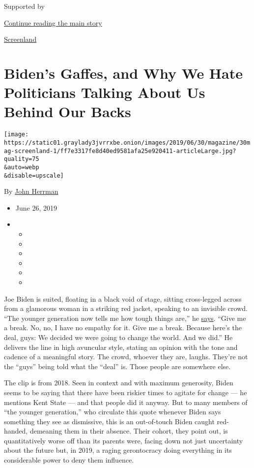 Supported by

\protect\hyperlink{after-sponsor}{Continue reading the main story}

\href{/column/screenland}{Screenland}

\hypertarget{bidens-gaffes-and-why-we-hate-politicians-talking-about-us-behind-our-backs}{%
\section{Biden's Gaffes, and Why We Hate Politicians Talking About Us
Behind Our
Backs}\label{bidens-gaffes-and-why-we-hate-politicians-talking-about-us-behind-our-backs}}

\texttt{[image: https://static01.graylady3jvrrxbe.onion/images/2019/06/30/magazine/30mag-screenland-1/ff7e3317fe8d40ed9581afa25e920411-articleLarge.jpg?quality=75\\\&auto=webp\\\&disable=upscale]}

By \href{https://www.nytimes3xbfgragh.onion/by/john-herrman}{John
Herrman}

\begin{itemize}
\item
  June 26, 2019
\item
  \begin{itemize}
  \item
  \item
  \item
  \item
  \item
  \item
  \end{itemize}
\end{itemize}

Joe Biden is suited, floating in a black void of stage, sitting
cross-legged across from a glamorous woman in a striking red jacket,
speaking to an invisible crowd. ``The younger generation now tells me
how tough things are,'' he
\href{https://www.latimes.com/politics/95641832-132.html}{says}. ``Give
me a break. No, no, I have no empathy for it. Give me a break. Because
here's the deal, guys: We decided we were going to change the world. And
we did.'' He delivers the line in high avuncular style, stating an
opinion with the tone and cadence of a meaningful story. The crowd,
whoever they are, laughs. They're not the ``guys'' being told what the
``deal'' is. Those people are somewhere else.

The clip is from 2018. Seen in context and with maximum generosity,
Biden seems to be saying that there have been riskier times to agitate
for change --- he mentions Kent State --- and that people did it anyway.
But to many members of ``the younger generation,'' who circulate this
quote whenever Biden says something they see as dismissive, this is an
out-of-touch Biden caught red-handed, demeaning them in their absence.
Their cohort, they point out, is quantitatively worse off than its
parents were, facing down not just uncertainty about the future but, in
2019, a raging gerontocracy doing everything in its considerable power
to deny them influence.

